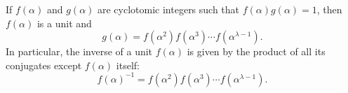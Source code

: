 If $f(\alpha)$ and $g(\alpha)$ are cyclotomic integers such that $f(\alpha)g(\alpha) = 1$, then $f(\alpha)$ is a unit and
$$g(\alpha) = f(\alpha^2) f(\alpha^3) \cdots f(\alpha^{\lambda-1}).$$
In particular, the inverse of a unit $f(\alpha)$ is given by the product of all its conjugates except $f(\alpha)$ itself:
$$f(\alpha)^{-1} = f(\alpha^2) f(\alpha^3) \cdots f(\alpha^{\lambda-1}).$$
